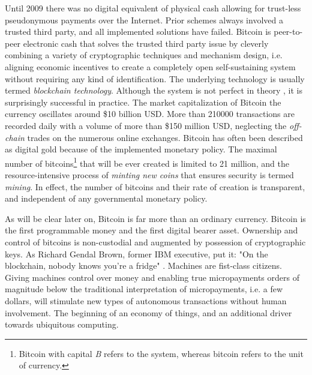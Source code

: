 Until 2009 there was no digital equivalent of physical cash allowing for trust-less pseudonymous payments over the Internet. Prior schemes always involved a trusted third party, and all implemented solutions have failed. Bitcoin is peer-to-peer electronic cash \parencite{nakamoto2008bitcoin} that solves the trusted third party issue by cleverly combining a variety of cryptographic techniques and mechanism design, i.e. aligning economic incentives to create a completely open self-sustaining system without requiring any kind of identification. The underlying technology is usually termed \emph{blockchain technology}. Although the system is not perfect in theory \parencite{Eyal2014}, it is surprisingly successful in practice. The market capitalization of Bitcoin the currency oscillates around \$10 billion USD. More than 210000 transactions are recorded daily with a volume of more than \$150 million USD, neglecting the \emph{off-chain} trades on the numerous online exchanges. Bitcoin has often been described as digital gold because of the implemented monetary policy. The maximal number of bitcoins\footnote{Bitcoin with capital \emph{B} refers to the system, whereas bitcoin refers to the unit of currency.} that will be ever created is limited to 21 million, and the resource-intensive process of \emph{minting new coins} that ensures security is termed \emph{mining}. In effect, the number of bitcoins and their rate of creation is transparent, and independent of any governmental monetary policy.

As will be clear later on, Bitcoin is far more than an ordinary currency. Bitcoin is the first programmable money and the first digital bearer asset. Ownership and control of bitcoins is non-custodial and augmented by possession of cryptographic keys. As Richard Gendal Brown, former IBM executive, put it: "On the blockchain, nobody knows you're a fridge" \parencite{brown2013}. Machines are fist-class citizens. Giving machines control over money and enabling true micropayments orders of magnitude below the traditional interpretation of micropayments, i.e. a few dollars, will stimulate new types of autonomous transactions without human involvement. The beginning of an economy of things, and an additional driver towards ubiquitous computing.

